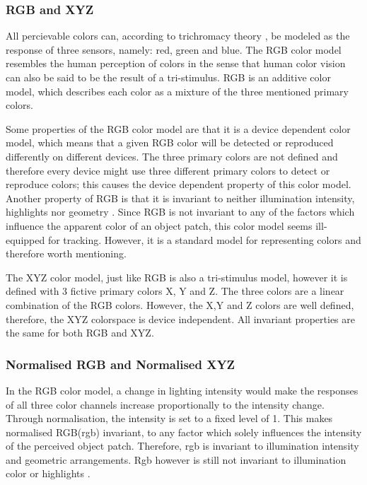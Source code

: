 \documentclass[a4paper,11pt]{article}
\begin{document}
\subsubsection{RGB and XYZ}

All percievable colors can, according to trichromacy theory \cite{gevers_color}, be modeled as the response of three sensors, namely: red, green and blue. The RGB color model resembles the human perception of colors in the sense that human color vision can also be said to be the result of a tri-stimulus.  RGB is an additive color model, which describes each color as a mixture of the three mentioned primary colors.

Some properties of the RGB color model are that it is a device dependent color model, which means that a given RGB color will be detected or reproduced differently on different devices. The three primary colors are not defined and therefore every device might use three different primary colors to detect or reproduce colors; this causes the device dependent property of this color model. Another property of RGB is that it is invariant to neither illumination intensity, highlights nor geometry \cite{gevers_invariant}. Since RGB is not invariant to any of the factors which influence the apparent color of an object patch, this color model seems ill-equipped for tracking. However, it is a standard model for representing colors and therefore worth mentioning.

The XYZ color model, just like RGB is also a tri-stimulus model, however it is defined  with 3 fictive primary colors X, Y and Z. The three colors are a linear combination of the RGB colors. However, the X,Y and Z colors are well defined, therefore, the XYZ colorspace is device independent. All invariant properties are the same for both RGB and XYZ.

\subsubsection{Normalised RGB and Normalised XYZ}

In the RGB color model, a change in lighting intensity would make the responses of all three color channels increase proportionally to the intensity change. Through normalisation, the intensity is set to a fixed level of 1. This makes normalised RGB(rgb) invariant, to any factor which solely influences the intensity of the perceived object patch. Therefore, rgb is invariant to illumination intensity and geometric arrangements. Rgb however is still not invariant to illumination color or highlights \cite{gevers_invariant}. 
\end{document}
